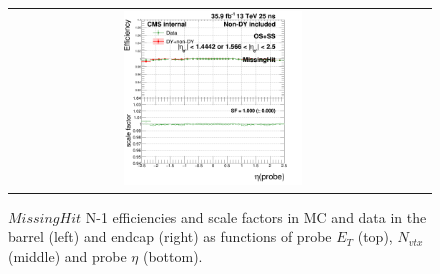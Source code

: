 \begin{figure}[bh]
\begin{center}
\begin{tabular}{cc}
      \includegraphics[width=0.45\textwidth]{figures/Zprime/2016/ScaleFactor/SameSign/N_1_eff/g_compare_cut_eta_Barrel+Endcap_ea_ta_inc_AS_N_1_MissHit_PUW.png}
    \end{tabular}
    \caption{$MissingHit$ N-1 efficiencies and scale factors in MC and data in the barrel (left) and endcap (right) as functions of probe $E_T$ (top), $N_{vtx}$ (middle) and probe $\eta$ (bottom).}
    \label{fig:MissHit_2016}
  \end{center}
\end{figure}

